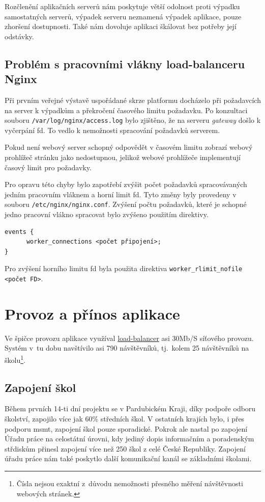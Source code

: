Rozčlenění aplikačních serverů nám poskytuje větší odolnost proti výpadku samostatných serverů, výpadek serveru neznamená výpadek aplikace, pouze zhoršení dostupnosti.
Také nám dovoluje aplikaci škálovat bez potřeby její odstávky.

\subsection{Problém s pracovními vlákny load-balanceru Nginx}

Při prvním veřejné výstavě uspořádané skrze platformu \bso{} docházelo při požadavcích na server k výpadkům a překročení časového limitu požadavku.
Po konzultaci souboru \verb|/var/log/nginx/access.log| bylo zjištěno, že na serveru \textit{gateway} došlo k vyčerpání \acrshort{fd}.
To vedlo k nemožnosti spracování požadavků serverem.

Pokud není webový server schopný odpovědět v časovém limitu zobrazí webový prohlížeč stránku jako nedostupnou,
jelikož webové prohlížeče implementují časový limit pro požadavky\cite{browser-timeout}.

Pro opravu této chyby bylo zapotřebí zvýšit počet požadavků spracovávaných jedním pracovním vláknem a horní limit \acrshort{fd}.
Tyto změny byly provedeny v souboru \verb|/etc/nginx/nginx.conf|.
Zvýšení počtu požadavků, které je schopné jedno pracovní vlákno spracovat bylo zvýšeno použitím direktivy.
\begin{verbatim}
events {
      worker_connections <počet připojení>;
}
\end{verbatim}
Pro zvýšení horního limitu \acrshort{fd} byla použita direktiva \verb|worker_rlimit_nofile <počet FD>|.

\section{Provoz a přínos aplikace}


Ve špičce provozu aplikace \bso{} využíval \hyperref[sub:load-balancing]{load-balancer} asi 30\si{Mb/S} síťového provozu.
Systém v~tu dobu navštívilo asi 790 návštěvníků, tj.\ kolem 25 návštěvníků na školu\footnote{Čísla nejsou exaktní z~důvodu nemožnosti přesného měření návštěvnosti webových stránek.}.

\subsection{Zapojení škol}

Během prvních 14-ti dní projektu se v Pardubickém Kraji, díky podpoře odboru školství, zapojilo více jak 60\% středních škol.
V ostatních krajích bylo, i přes podporu \acrshort{msmt}, zapojení škol pouze sporadické.
Pokrok ale nastal po zapojení Úřadu práce na celostátní úrovni, kdy jediný dopis informačním a poradenským střdiskům přinesl zapojení více než 250 škol z celé České Republiky.
Zapojení úřadu práce nám také poskytlo další komunikační kanál se základními školami.

